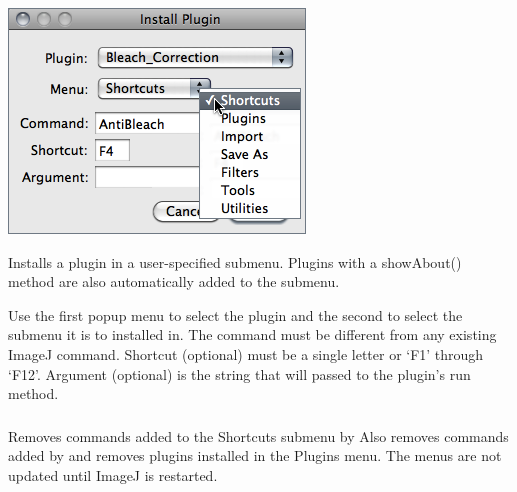 \begin{minipage}[c][1\totalheight][t]{0.42\columnwidth}%
\includegraphics[scale=0.55]{images/InstallPlugin}%
\end{minipage}%
\begin{minipage}[c][1\totalheight][t]{0.58\columnwidth}%
Installs a plugin in a user-specified submenu. Plugins with a showAbout()
method are also automatically added to the {\small {}}
submenu.\medskip{}


Use the first popup menu to select the plugin and the second to select
the submenu it is to installed in. The command must be different from
any existing ImageJ command. Shortcut (optional) must be a single
letter or `F1' through `F12'. Argument (optional) is the string
that will passed to the plugin's run method.%
\end{minipage}


\subsubsection{\protect{}}

Removes commands added to the Shortcuts submenu by 
Also removes commands added by 
and removes plugins installed in the Plugins menu. The menus are not
updated until ImageJ is restarted.


\subsection{\protect{}\label{sub:Utilities}}


\subsubsection{\protect{}\label{sub:Control-Panel...}}

